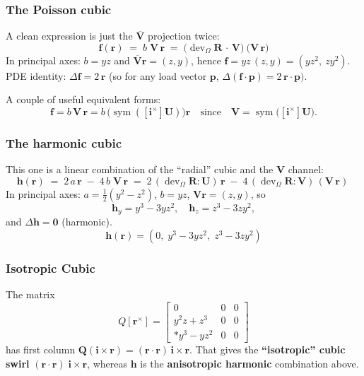 \subsubsection{The Poisson cubic}\label{the-poisson-cubic}

A clean expression is just the \(\overline{\mathbf{V}}\) projection twice: 
\[
\mathbf{f}(\bm{r})\;=\;b\;{\mathbf{V}}\,\bm{r}
\;=\;\bigl(\operatorname{dev}_{\Omega}\bm{R}\,\cdot\,{\mathbf{V}}\bigr)\ \bigl({\mathbf{V}}\,\bm{r}\bigr)
\] 
In principal axes: \(b=yz\) and \(\overline{\mathbf{V}}\bm{r}=(z,y)\),
hence \(\mathbf{f}=yz\,(z,y)=(y z^2,\ z y^2)\). PDE identity:
\(\Delta \mathbf{f}=2\,\bm{r}\) (so for any load vector \(\bm{p}\),
\(\Delta(\mathbf{f}\cdot\bm{p})=2\,\bm{r}\cdot\bm{p})\).

A couple of useful equivalent forms: 
\[
\mathbf{f} = b\,{\mathbf{V}}\,\bm{r}
= b\,\big(\operatorname{sym}([\mathbf{i}^{\times}]{\mathbf{U}})\big)\bm{r}
\quad\text{since}
\quad {\mathbf{V}}=\operatorname{sym} \bigl([\mathbf{i}^{\times}]{\mathbf{U}}\bigr).
\]

\subsubsection{The harmonic cubic}\label{the-harmonic-cubic}

This one is a linear combination of the ``radial'' cubic and the
\({\mathbf{V}}\) channel: 
\[
\mathbf{h}(\bm{r})\;=\;2\,a\,\bm{r}\;-\;4\,b\;{\mathbf{V}}\,\bm{r}
\;=\;2\,(\operatorname{dev}_{\Omega}\bm{R}:{\mathbf{U}})\,\bm{r}\;-\;4\,(\operatorname{dev}_{\Omega}\bm{R}:{\mathbf{V}})\,({\mathbf{V}}\,\bm{r})\ 
\] 
In principal axes: \(a=\tfrac12(y^2-z^2)\), \(b=yz\),
\({\mathbf{V}}\bm{r}=(z,y)\), so 
\[
\mathbf{h}_y= y^3-3yz^2,\quad
\mathbf{h}_z= z^3-3zy^2,
\]
and \(\Delta \mathbf{h}=\mathbf{0}\) (harmonic). 
\[
\mathbf{h}(\bm{r})=(0,\;y^3-3y z^2,\;z^3-3z y^2)
\]

\subsubsection{Isotropic Cubic}\label{isotropic-cubic}

The matrix \[
Q[\bm{r}^\times] =
\begin{bmatrix}
0&0&0\\
y^{2} z + z^{3} & 0 & 0\\
* y^{3} - y z^{2} & 0 & 0
\end{bmatrix}
\] 
has first column
\(\bm{Q}(\mathbf{i}\times\bm{r}) = (\bm{r}\cdot\bm{r})\,\mathbf{i}\times\bm{r}\).
That gives the \textbf{``isotropic'' cubic swirl}
\((\bm{r}\cdot\bm{r})\;\mathbf{i}\times\bm{r}\), whereas
\(\mathbf{h}\) is the \textbf{anisotropic harmonic} combination above.


